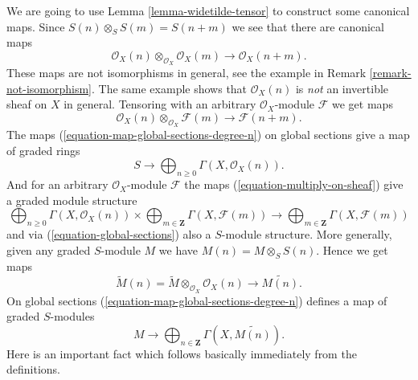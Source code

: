 \documentclass{stacks-project}
\theoremstyle{plain}
\theoremstyle{definition}
\theoremstyle{remark}
\numberwithin{equation}{subsection}
\begin{document}
\noindent
We are going to use Lemma \ref{lemma-widetilde-tensor}
to construct some canonical maps.
Since $S(n) \otimes_S S(m) = S(n + m)$ we see that there
are canonical maps
\begin{equation}
\label{equation-multiply}
\mathcal{O}_X(n) \otimes_{\mathcal{O}_X} \mathcal{O}_X(m)
\longrightarrow
\mathcal{O}_X(n + m).
\end{equation}
These maps are not isomorphisms in general, see the example in
Remark \ref{remark-not-isomorphism}. The same example shows
that $\mathcal{O}_X(n)$ is {\it not} an invertible sheaf on $X$ in
general. Tensoring with an arbitrary $\mathcal{O}_X$-module $\mathcal{F}$
we get maps
\begin{equation}
\label{equation-multiply-on-sheaf}
\mathcal{O}_X(n) \otimes_{\mathcal{O}_X} \mathcal{F}(m)
\longrightarrow
\mathcal{F}(n + m).
\end{equation}
The maps (\ref{equation-map-global-sections-degree-n})
on global sections give a map of graded rings
\begin{equation}
\label{equation-global-sections}
S \longrightarrow \bigoplus\nolimits_{n \geq 0} \Gamma(X, \mathcal{O}_X(n)).
\end{equation}
And for an arbitrary $\mathcal{O}_X$-module $\mathcal{F}$ the maps
(\ref{equation-multiply-on-sheaf}) give a graded module structure
\begin{equation}
\label{equation-global-sections-module}
\bigoplus\nolimits_{n \geq 0} \Gamma(X, \mathcal{O}_X(n))
\times
\bigoplus\nolimits_{m \in \mathbf{Z}} \Gamma(X, \mathcal{F}(m))
\longrightarrow
\bigoplus\nolimits_{m \in \mathbf{Z}} \Gamma(X, \mathcal{F}(m))
\end{equation}
and via (\ref{equation-global-sections}) also a $S$-module structure.
More generally, given any graded $S$-module
$M$ we have $M(n) = M \otimes_S S(n)$. Hence we get maps
\begin{equation}
\label{equation-multiply-more-generally}
\widetilde M(n)
=
\widetilde M
\otimes_{\mathcal{O}_X}
\mathcal{O}_X(n)
\longrightarrow
\widetilde{M(n)}.
\end{equation}
On global sections (\ref{equation-map-global-sections-degree-n})
defines a map of graded $S$-modules
\begin{equation}
\label{equation-global-sections-more-generally}
M \longrightarrow
\bigoplus\nolimits_{n \in \mathbf{Z}} \Gamma(X, \widetilde{M(n)}).
\end{equation}
Here is an important fact which follows basically immediately from the
definitions.
\end{document}
